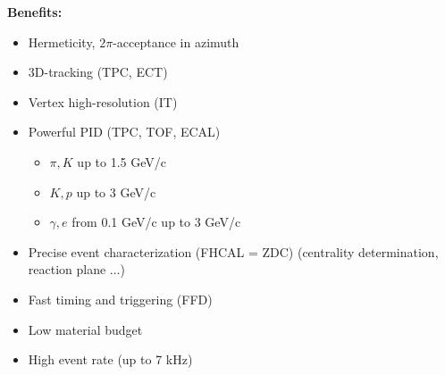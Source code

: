 \documentclass[dvipsnames] {beamer}
\begin{document}
\begin{frame}[shrink=25]
\begin{columns}[c]
    \begin{block}{\bf \centering Benefits:}
      \begin{itemize}
      \item Hermeticity, $2\pi$-acceptance in azimuth
      \item 3D-tracking (TPC, ECT)
      \item Vertex high-resolution (IT)
      \item Powerful PID (TPC, TOF, ECAL)
        \begin{itemize}
        \item $\pi, K$ up to 1.5 GeV/c
        \item $K, p$ up to 3 GeV/c
        \item $\gamma, e$ from 0.1 GeV/c up to 3 GeV/c
        \end{itemize}
      \item Precise event characterization (FHCAL = ZDC) (centrality determination, reaction plane ...)
      \item Fast timing and triggering (FFD)
      \item Low material budget
      \item High event rate (up to 7 kHz) 
      \end{itemize}
    \end{block}
  \end{columns}
\end{frame}
\end{document}
